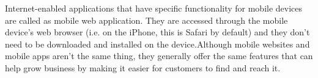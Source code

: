 			 Internet-enabled applications that have specific functionality for mobile devices are called as mobile web application. They are accessed through the mobile device’s web browser (i.e. on the iPhone, this is Safari by default) and they don’t need to be downloaded and installed on the device.Although mobile websites and mobile apps aren't the same thing, they generally offer the same features that can help grow business by making it easier for customers to find and reach it. 
			

%
%
%
%
%
